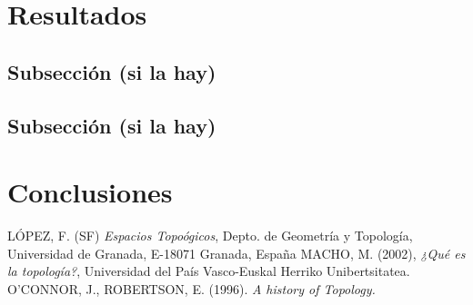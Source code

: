 \documentclass[12pt, twoside]{article} %
\begin{document}
\newpage
\section{Resultados}
\lipsum[1] %
\subsection{Subsección (si la hay)}
\lipsum %
\subsection{Subsección (si la hay)}
\lipsum %

\newpage
\section{Conclusiones}
\lipsum[5] %
\lipsum[1] %

\newpage

\begin{thebibliography}{X} %
 LÓPEZ, F. (SF) \textit{Espacios Topoógicos}, Depto. de Geometría y Topología, Universidad de Granada, E-18071 Granada, España
 MACHO, M. (2002), \textit{¿Qué es la topología?}, Universidad del País Vasco-Euskal Herriko Unibertsitatea.
 O’CONNOR, J., ROBERTSON, E. (1996). \textit{A history of Topology.}
\end{thebibliography}

\vspace{3cm}
\noindent{}
\\ \\ \\
\end{document}
